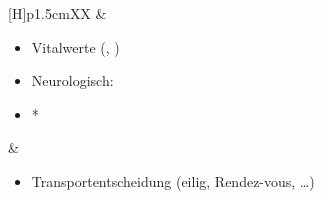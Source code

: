 \documentclass[
ngerman,
paper=a4,
asymmetric,
fontsize=9pt,
draft=false,
openany,
numbers=noenddot,
bibtotocnumbered,
footnotes=multiple,
toc=flat,
]{scrbook}
\begin{document}
{\begin{minipage}[t]{\linewidth -
{2\fboxrule} - {2\fboxsep}}
\begin{minipage}[t]{\linewidth}
{\begin{tabularx}{\linewidth}[H]{p{1.5cm}XX}
&
\begin{minipage}[t]{\linewidth}
\begin{itemize}
  \item Vitalwerte (, )
  \item Neurologisch:
  \item *
\end{itemize}
\end{minipage}
&
\noindent\color{Indigo}\begin{minipage}[t]{\linewidth}
\begin{itemize}
  \item Transportentscheidung (eilig, Rendez-vous, \ldots)
\end{itemize}
\end{minipage}
\\\addlinespace\midrule\addlinespace
\noindent{}


\end{tabularx}}
\end{minipage}
\end{minipage}}
\end{document}
